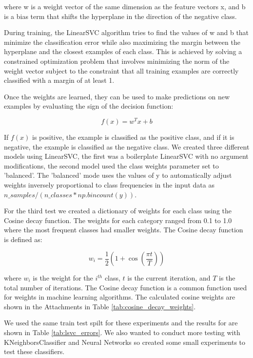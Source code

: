 where w is a weight vector of the same dimension as the feature vectors x, and b is a bias term that shifts the hyperplane in the direction of the negative class.

During training, the LinearSVC algorithm tries to find the values of w and b that minimize the classification error while also maximizing the margin between the hyperplane and the closest examples of each class. This is achieved by solving a constrained optimization problem that involves minimizing the norm of the weight vector subject to the constraint that all training examples are correctly classified with a margin of at least 1.

Once the weights are learned, they can be used to make predictions on new examples by evaluating the sign of the decision function:

\begin{equation}
f(x) = w^T x + b
\end{equation}

If $f(x)$ is positive, the example is classified as the positive class, and if it is negative, the example is classified as the negative class. We created three different models using LinearSVC, the first was a boilerplate LinearSVC with no argument modifications, the second model used the class weights parameter set to 'balanced'. The 'balanced' mode uses the values of y to automatically adjust weights inversely proportional to class frequencies in the input data as $n\_samples / (n\_classes * np.bincount(y))$. 

For the third test we created a dictionary of weights for each class using the Cosine decay function. The weights for each category ranged from 0.1 to 1.0 where the most frequent classes had smaller weights. The Cosine decay function is defined as:

\begin{equation}
    w_i = \frac{1}{2} \left(1 + \cos \left(\frac{\pi t}{T}\right)\right)
\label{eq:cosine_decay}
\end{equation}

where $w_i$ is the weight for the $i^{th}$ class, $t$ is the current iteration, and $T$ is the total number of iterations. The Cosine decay function is a common function used for weights in machine learning algorithms. The calculated cosine weights are shown in the Attachments in Table \ref{tab:cosine_decay_weights}.

We used the same train test spilt for these experiments and the results for are shown in Table \ref{tab:lsvc_errors}. We also wanted to conduct more testing with KNeighborsClassifier and Neural Networks so created some small experiments to test these classifiers.

